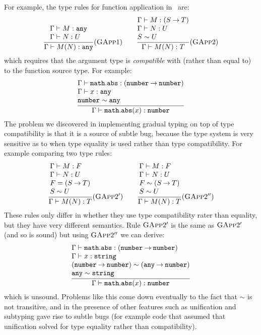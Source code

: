 \documentclass[acmsmall,review,screen]{acmart}
\makeatletter
\newcommand{\infer}[2]{\frac{\displaystyle\begin{array}{@{}l@{}}#1\end{array}}{\displaystyle#2}}
\newcommand{\ANY}{\mathtt{any}}
\newcommand{\NUMBER}{\mathtt{number}}
\newcommand{\STRING}{\mathtt{string}}
\newcommand{\fun}{\mathbin{\rightarrow}}
\newcommand{\compat}{\sim}
\makeatother
\begin{document}
For example, the type rules for function application
in~\cite{ST06:GradualTyping} are:
\[
    \infer{
      \Gamma \vdash M : \ANY \\
      \Gamma \vdash N : U
    }{
      \Gamma \vdash M(N) : \ANY
    }
    (\textsc{GApp}1)
\qquad
    \infer{
      \Gamma \vdash M : (S \fun T) \\
      \Gamma \vdash N : U \\
      S \compat U
    }{
      \Gamma \vdash M(N) : T
    }
    (\textsc{GApp}2)
\]
which requires that the argument type is \emph{compatible} with
(rather than equal to) to the function source type.
For example:
\[
    \infer{
      \Gamma \vdash \mathtt{math.abs} : (\NUMBER \fun \NUMBER) \\
      \Gamma \vdash x : \ANY \\
      \NUMBER \compat \ANY
    }{
      \Gamma \vdash \mathtt{math.abs}(x) : \NUMBER
    }
\]
The problem we discovered in implementing gradual typing on top of type
compatibility is that it is a source of subtle bug, because the type
system is very sensitive as to when type equality is used rather than
type compatibility. For example comparing two type rules:
\[
    \infer{
      \Gamma \vdash M : F \\
      \Gamma \vdash N : U \\
      F = (S \fun T) \\
      S \compat U
    }{
      \Gamma \vdash M(N) : T
    }
    (\textsc{GApp}2')
 \qquad
    \infer{
      \Gamma \vdash M : F \\
      \Gamma \vdash N : U \\
      F \compat (S \fun T) \\
      S \compat U
    }{
      \Gamma \vdash M(N) : T
    }
    (\textsc{GApp}2'')
\]
These rules only differ in whether they use type compatibility
rater than equality, but they have very different semantics. Rule
$\textsc{GApp}2'$ is the same as $\textsc{GApp}2'$ (and so is sound)
but using $\textsc{GApp}2''$ we can derive:
\[
    \infer{
      \Gamma \vdash \mathtt{math.abs} : (\NUMBER \fun \NUMBER) \\
      \Gamma \vdash x : \STRING \\
      (\NUMBER \fun \NUMBER) \compat (\ANY \fun \NUMBER) \\
      \ANY \compat \STRING \\
    }{
      \Gamma \vdash \mathtt{math.abs}(x) : \NUMBER
    }
\]
which is unsound. Problems like this come down eventually to the fact
that $\compat$ is not transitive, and in the presence of other
features such as unification and subtyping gave rise to subtle bugs
(for example code that assumed that unification solved for type
equality rather than compatibility).
\end{document}
